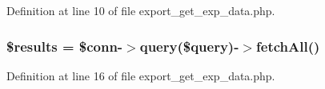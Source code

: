 Definition at line 10 of file export\-\_\-get\-\_\-exp\-\_\-data.\-php.

\hypertarget{export__get__exp__data_8php_a233d12bd8b6d3453e9a7a3f0b8c31db2}{
\subsubsection[{\$results}]{\setlength{\rightskip}{0pt plus 5cm}\$results = \$conn-\/$>$query(\$query)-\/$>$fetch\-All()}}\label{export__get__exp__data_8php_a233d12bd8b6d3453e9a7a3f0b8c31db2}


Definition at line 16 of file export\-\_\-get\-\_\-exp\-\_\-data.\-php.

